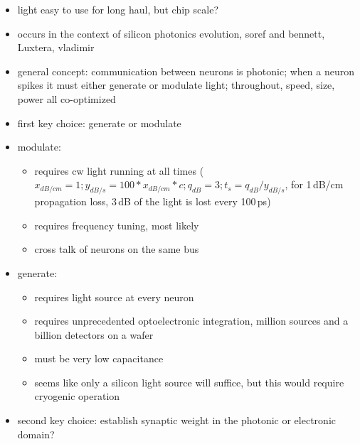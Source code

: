 \documentclass[twocolumn]{article}
\begin{document}
\begin{itemize}

\item light easy to use for long haul, but chip scale?
\item occurs in the context of silicon photonics evolution, soref and bennett, Luxtera, vladimir

\item general concept: communication between neurons is photonic; when a neuron spikes it must either generate or modulate light; throughout, speed, size, power all co-optimized

\item first key choice: generate or modulate

\item modulate:
\begin{itemize}
\item requires cw light running at all times ($x_{dB/cm} = 1; y_{dB/s} = 100*x_{dB/cm}*c; q_{dB} = 3; t_s = q_{dB}/y_{dB/s}$, for 1\,dB/cm propagation loss, 3\,dB of the light is lost every 100\,ps)
\item requires frequency tuning, most likely
\item cross talk of neurons on the same bus
\end{itemize}

\item generate:
\begin{itemize}
\item requires light source at every neuron
\item requires unprecedented optoelectronic integration, million sources and a billion detectors on a wafer
\item must be very low capacitance
\item seems like only a silicon light source will suffice, but this would require cryogenic operation
\end{itemize}

\item second key choice: establish synaptic weight in the photonic or electronic domain?


\end{itemize}
\end{document}
